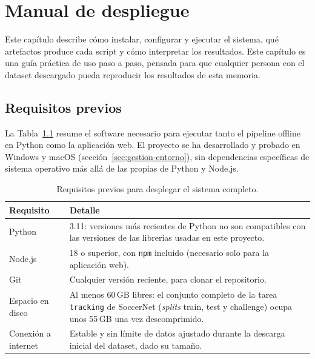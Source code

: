 \chapter{Manual de despliegue}
\label{cap:manual}

Este capítulo describe cómo instalar, configurar y ejecutar el sistema, qué
artefactos produce cada script y cómo interpretar los resultados. Este capítulo es una guía práctica de uso
paso a paso, pensada para que cualquier persona con el dataset descargado
pueda reproducir los resultados de esta memoria.

\section{Requisitos previos}
\label{sec:manual-requisitos}

La Tabla~\ref{tab:manual-requisitos} resume el software necesario para
ejecutar tanto el pipeline offline en Python como la aplicación web. El
proyecto se ha desarrollado y probado en Windows y macOS
(sección~\ref{sec:gestion-entorno}), sin dependencias específicas de
sistema operativo más allá de las propias de Python y Node.js.

\begin{table}[htp]
\centering
\caption{Requisitos previos para desplegar el sistema completo.}
\label{tab:manual-requisitos}
\renewcommand{\arraystretch}{1.25}
\begin{tabular}{|p{3.4cm}|p{9.4cm}|}
\hline
\rowcolor{gray!25}
\textbf{Requisito} & \textbf{Detalle} \\
\hline
Python & 3.11: versiones más recientes de Python no son
  compatibles con las versiones de las librerías usadas en este proyecto. \\
\hline
Node.js & 18 o superior, con \texttt{npm} incluido (necesario solo para la
  aplicación web). \\
\hline
Git & Cualquier versión reciente, para clonar el repositorio. \\
\hline
Espacio en disco & Al menos 60\,GB libres: el conjunto completo de la tarea
  \texttt{tracking} de SoccerNet (\emph{splits} train, test y challenge)
  ocupa unos 55\,GB una vez descomprimido. \\
\hline
Conexión a internet & Estable y sin límite de datos ajustado durante la
  descarga inicial del dataset, dado
  su tamaño. \\
\hline
\end{tabular}
\end{table}

